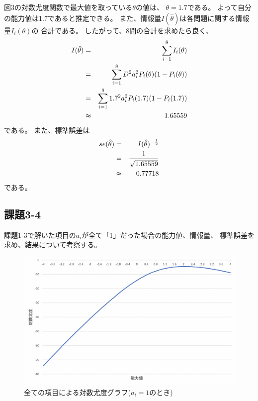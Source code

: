 \documentclass[12pt]{jarticle}
\begin{document}
図3の対数尤度関数で最大値を取っている$\theta$の値は、
$\theta=1.7$である。
よって自分の能力値は1.7であると推定できる。
また、情報量$I(\hat{\theta})$は各問題に関する情報量$I_i({\theta})$の
合計である。
したがって、8問の合計を求めたら良く、
\begin{eqnarray*}
    I(\hat{\theta})&=&\sum_{i=1}^{8}{I_i({\theta})}\\
    &=&\sum_{i=1}^{8}{D^2a_i^2P_i(\theta)(1-P_i(\theta))}\\
    &=&\sum_{i=1}^{8}{1.7^2a_i^2P_i(1.7)(1-P_i(1.7))}\\
    &\thickapprox & 1.65559
\end{eqnarray*}
である。
\clearpage
また、標準誤差は
\begin{eqnarray*}
    se(\hat{\theta})&=&I(\hat{\theta})^{-\frac{1}{2}}\\
    &= &\frac{1}{\sqrt{ 1.65559}}\\
    &\thickapprox& 0.77718
\end{eqnarray*}
である。

\subsection{課題3-4}
\begin{shadebox}
    課題1-3で解いた項目の$a_i$が全て「1」だった場合の能力値、情報量、
    標準誤差を求め、結果について考察する。
\end{shadebox}

\begin{figure}[h]
    \begin{center}
        \includegraphics[scale=0.3]{kadai5_3_4.png}
    \end{center}
    \caption{全ての項目による対数尤度グラフ($a_i=1$のとき)}
\end{figure}
\end{document}
